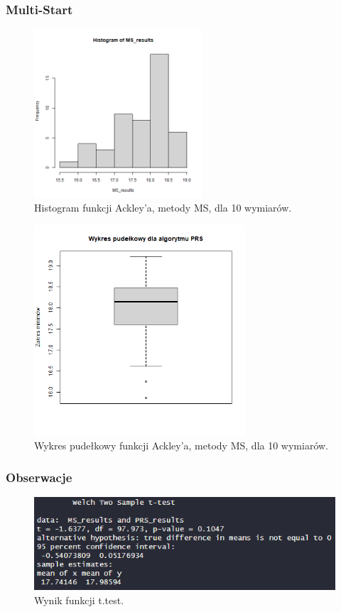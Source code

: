 \documentclass{lab}
\begin{document}
\subsubsection{Multi-Start}
\begin{figure}[H]
  \centering
  \includegraphics[width=0.56\textwidth]{img/dim10_MS_Ackley_his.png}
  \caption{Histogram funkcji Ackley'a, metody MS, dla 10 wymiarów.}
\end{figure}
\begin{figure}[H]
  \centering
  \includegraphics[width=0.7\textwidth]{img/dim10_MS_Ackley.png}
  \caption{Wykres pudełkowy funkcji Ackley'a, metody MS, dla 10 wymiarów.}
\end{figure}

\subsubsection{Obserwacje}
 \begin{figure}[H]
     \centering
     \includegraphics[width=0.9\linewidth]{img/T4.png}
     \caption{Wynik funkcji t.test.}
     \label{fig:enter-label}
 \end{figure}
\end{document}

